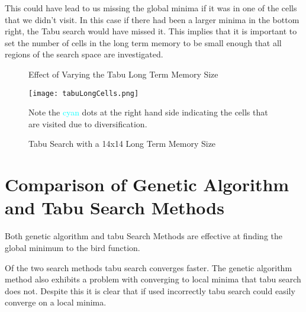 \documentclass[a4paper,12pt]{article}
\begin{document}
This could have lead to us missing the global minima if it was in one of the cells that we didn't visit.
In this case if there had been a larger minima in the bottom right, the Tabu search would have missed it.
This implies that it is important to set the number of cells in the long term memory to be small enough that all regions of the search space are investigated.


\begin{figure}[H]
\centering
{}
\caption{Effect of Varying the Tabu Long Term Memory Size}
\label{fig:tabuLong}
\end{figure}

\begin{figure}[H]
 \centering
 \texttt{[image: tabuLongCells.png]}
 \caption{Tabu Search with a 14x14 Long Term Memory Size}
 Note the \textcolor{cyan}{cyan} dots at the right hand side indicating the cells that are visited due to diversification.
 \label{fig:tabu14}
\end{figure}

\section{Comparison of Genetic Algorithm and Tabu Search Methods}

Both genetic algorithm and tabu Search Methods are effective at finding the global minimum to the bird function. 

Of the two search methods tabu search converges faster. 
The genetic algorithm method also exhibits a problem with converging to local minima that tabu search does not. 
Despite this it is clear that if used incorrectly tabu search could easily converge on a local minima.
\end{document}
